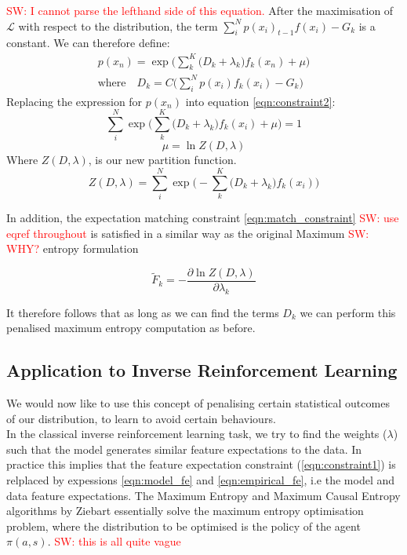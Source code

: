 \documentclass[letterpaper]{article}
\newcommand{\sw}[1]{\textcolor{red}{SW: #1}}
\begin{document}
\sw{I cannot parse the lefthand side of this equation.}
After the maximisation of $\mathcal{L}$ with respect to the distribution, the term $\sum_i^N p(x_i)_{t-1}f(x_i) - G_k$ is a constant.
We can therefore define:
\begin{equation}
	\begin{split}
	p(x_n) =\exp \Big( \sum_k^K\big(D_k+\lambda_k\big)f_k(x_n) + \mu \Big)\\
	\text{where} \quad D_k = C\big(\sum_i^N p(x_i)f_k(x_i) - G_k\big)
	\end{split}
\end{equation}
Replacing the expression for $p(x_n)$ into equation \ref{eqn:constraint2}:
\begin{equation}
	\sum_i^N \exp \Big( \sum_k^K\big(D_k+\lambda_k\big)f_k(x_i) + \mu \Big) = 1
\end{equation}
\begin{equation}
	\mu = \ln Z(D,\lambda)
\end{equation}
Where $Z(D,\lambda)$, is our new partition function.
\begin{equation}
	Z(D,\lambda) = \sum_i^N \exp \Big( -\sum_k^K\big(D_k+\lambda_k\big)f_k(x_i) \Big) 
\end{equation}

In addition, the expectation matching constraint \ref{eqn:match_constraint} \sw{use eqref throughout} is satisfied in a similar way as the original 
Maximum \sw{WHY?} entropy formulation

\begin{equation}
	\widetilde{F}_k = -\frac{\partial\ln Z(D,\lambda)}{\partial\lambda_k}
\end{equation}

It therefore follows that as long as we can find the terms $D_k$ we can perform 
this penalised maximum entropy computation as before.

\subsection{Application to Inverse Reinforcement Learning}
We would now like to use this concept of penalising certain 
statistical outcomes of our distribution, to learn to avoid certain behaviours.\\ 
In the classical inverse reinforcement learning task, we try to find the
weights ($\lambda$) such that the model generates similar feature expectations to the 
data. In practice this implies that the feature expectation constraint (\ref{eqn:constraint1}) is relplaced by expessions
\ref{eqn:model_fe} and \ref{eqn:empirical_fe}, i.e the model and data feature expectations. The Maximum Entropy and Maximum Causal Entropy algorithms by Ziebart
essentially solve the maximum entropy optimisation problem, where the distribution to be optimised
is the policy of the agent $\pi(a,s)$. \sw{this is all quite vague}
\end{document}

